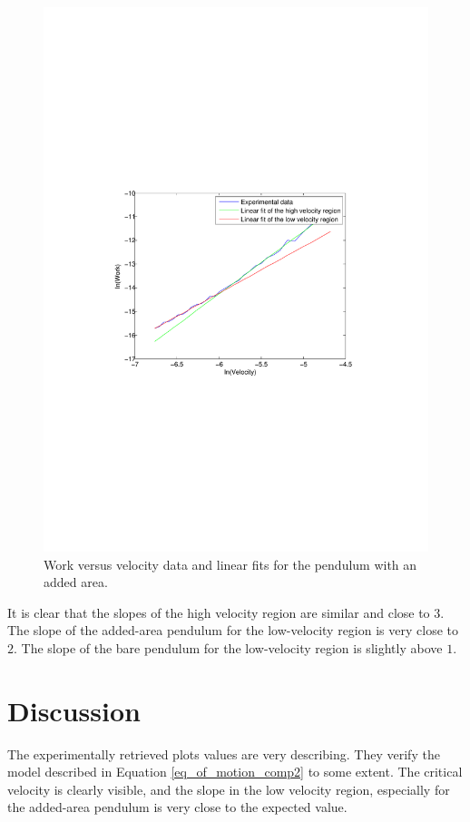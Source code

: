 \documentclass[11pt, a4paper]{article}
\begin{document}
\begin{figure}[h!]
	\centering
	\includegraphics[trim=10.0cm 10.0cm 10.0cm 10.0cm, scale=0.7]{paper}
	\caption{Work versus velocity data and  linear fits for the pendulum with an added area.}
	\label{f:paper}
\end{figure}

It is clear that the slopes of the high velocity region are similar and close to $3$. 
The slope of the added-area pendulum for the low-velocity region is very close to $2$.
The slope of the bare pendulum for the low-velocity region is slightly above $1$.



\section{Discussion}
The experimentally retrieved plots values are very describing.
They verify the model described in Equation \ref{eq_of_motion_comp2} to some extent.
The critical velocity is clearly visible, and the slope in the low velocity region, especially for the added-area pendulum is very close to the expected value.
\end{document}
